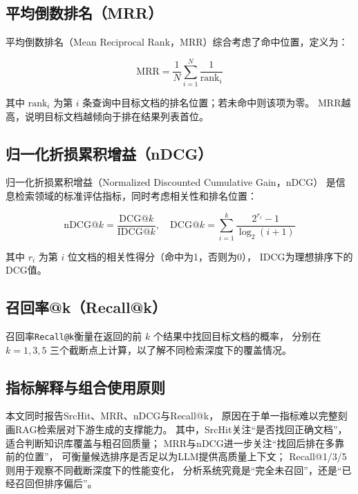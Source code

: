 \subsection{平均倒数排名（MRR）}

平均倒数排名（Mean Reciprocal Rank，MRR）综合考虑了命中位置，定义为：

\begin{equation}
    \text{MRR} = \frac{1}{N} \sum_{i=1}^{N} \frac{1}{\text{rank}_i}
\end{equation}

其中 $\text{rank}_i$ 为第 $i$ 条查询中目标文档的排名位置；若未命中则该项为零。
MRR越高，说明目标文档越倾向于排在结果列表首位。

\subsection{归一化折损累积增益（nDCG）}

归一化折损累积增益（Normalized Discounted Cumulative Gain，nDCG）
是信息检索领域的标准评估指标，同时考虑相关性和排名位置：

\begin{equation}
    \text{nDCG}@k = \frac{\text{DCG}@k}{\text{IDCG}@k}, \quad
    \text{DCG}@k = \sum_{i=1}^{k} \frac{2^{r_i} - 1}{\log_2(i+1)}
\end{equation}

其中 $r_i$ 为第 $i$ 位文档的相关性得分（命中为1，否则为0），
IDCG为理想排序下的DCG值。

\subsection{召回率@k（Recall@k）}

召回率\texttt{Recall@k}衡量在返回的前 $k$ 个结果中找回目标文档的概率，
分别在 $k=1, 3, 5$ 三个截断点上计算，以了解不同检索深度下的覆盖情况。

\subsection{指标解释与组合使用原则}

本文同时报告SrcHit、MRR、nDCG与Recall@k，
原因在于单一指标难以完整刻画RAG检索层对下游生成的支撑能力。
其中，SrcHit关注``是否找回正确文档''，
适合判断知识库覆盖与粗召回质量；
MRR与nDCG进一步关注``找回后排在多靠前的位置''，
可衡量候选排序是否足以为LLM提供高质量上下文；
Recall@1/3/5则用于观察不同截断深度下的性能变化，
分析系统究竟是``完全未召回''，还是``已经召回但排序偏后''。

